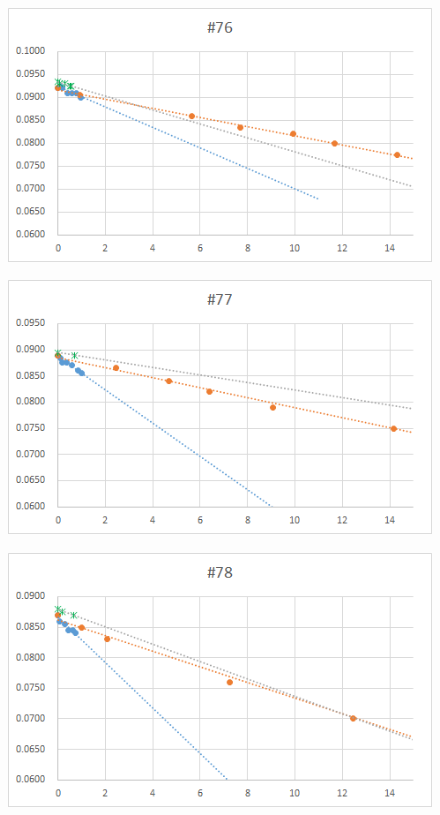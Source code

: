   \begin{figure}[htbp]
    \centering
       \includegraphics[width=120mm]{vol_076.png}
  \end{figure}
  \begin{figure}[htbp]
    \centering
       \includegraphics[width=120mm]{vol_077.png}
  \end{figure}
  \begin{figure}[htbp]
    \centering
       \includegraphics[width=120mm]{vol_078.png}
  \end{figure}
  \clearpage